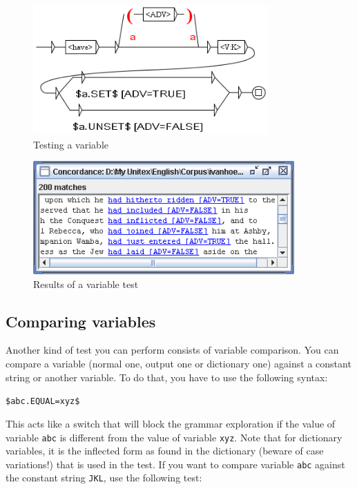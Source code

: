 \begin{figure}[!ht]
\begin{center}
\includegraphics[width=9cm]{resources/img/fig6-29b.png}
\caption{Testing a variable\label{fig-testing-a-variable}}
\end{center}
\end{figure}

\begin{figure}[!ht]
\begin{center}
\includegraphics[width=10cm]{resources/img/fig6-29c.png}
\caption{Results of a variable test\label{fig-testing-a-variable-results}}
\end{center}
\end{figure}


\subsection{Comparing variables}
Another kind of test you can perform consists of variable comparison.
You can compare a variable (normal one, output one or dictionary one) against a constant string or
another variable. To do that, you have to use the following syntax:

\bigskip
\noindent \verb+$abc.EQUAL=xyz$+

\bigskip
\noindent This acts like a switch that will block the grammar exploration if the value of variable \verb+abc+
is different from the value of variable \verb+xyz+. Note that for dictionary variables, it is the inflected form
as found in the dictionary (beware of case variations!) that is used in the test. If you want to compare variable
\verb+abc+ against the constant string \verb+JKL+, use the following test:


